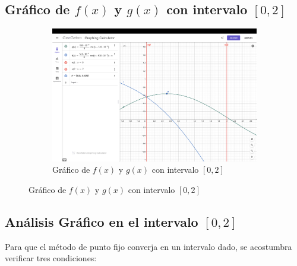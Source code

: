 \subsection{Gráfico de $f(x)$ y $g(x)$ con intervalo $[0,2]$}
\begin{figure}[H]
    \centering
    \begin{subfigure}[b]{\textwidth}
        \centering
        \includegraphics[width=\textwidth]{Figures/0. General/2.1.2.png}
        \caption{Gráfico de $f(x)$ y $g(x)$ con intervalo $[0,2]$}
        \label{fig: Grafico de f(x) y g(x) con intervalo [0,2]}
    \end{subfigure}
\end{figure}

\subsection{Análisis Gráfico en el intervalo \([0,2]\)}

Para que el método de punto fijo converja en un intervalo dado, se acostumbra verificar tres condiciones:

